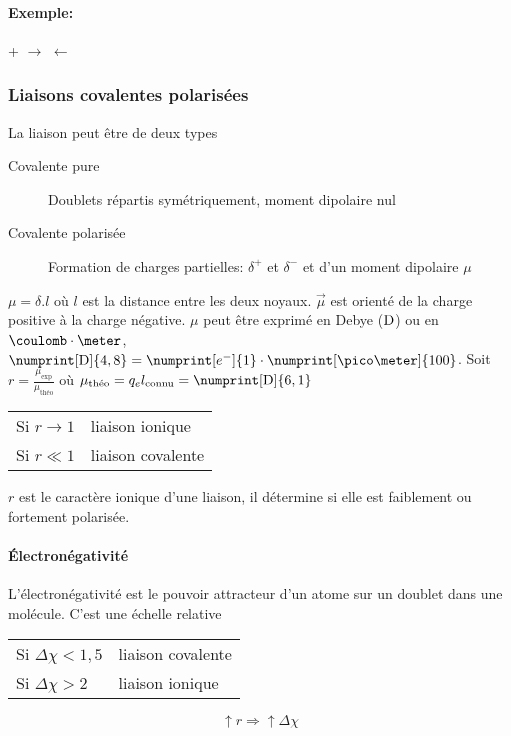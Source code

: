 \paragraph{Exemple:}
\begin{center}
	\hspace{0.3cm} + \hspace{0.3cm}$\longrightarrow$ $\leftarrow$
\end{center}
\subsubsection{Liaisons covalentes polarisées}
La liaison peut être de deux types
\begin{description}
	\item[Covalente pure] Doublets répartis symétriquement, moment dipolaire nul
	\item[Covalente polarisée] Formation de charges partielles: $\delta^+$ et $\delta^-$ et d'un moment dipolaire $\mu$
\end{description}
$\mu = \delta . l$ où $l$ est la distance entre les deux noyaux.
$\vec{\mu}$ est orienté de la charge positive à la charge négative.
$\mu$ peut être exprimé en Debye ($\mathrm{D}$) ou en $\coulomb\cdot\meter$, $\numprint[\debye]{4,8} = \numprint[e^-]{1} \cdot \numprint[\pico\meter]{100}$.
Soit $r = \frac{\mu_{\mathrm{exp}}}{\mu_{\textrm{théo}}}$ où $\mu_{\textrm{théo}} = q_e l_{\mathrm{connu}} = \numprint[\debye]{6,1}$
\begin{center}
	\begin{tabular}{ll}
		Si $r \to 1$ & liaison ionique\\
		Si $r \ll 1$ & liaison covalente
	\end{tabular}
\end{center}
$r$ est le caractère ionique d'une liaison, il détermine si elle est faiblement ou fortement polarisée.

\paragraph{\'Electronégativité}
L'électronégativité est le pouvoir attracteur d'un atome sur un doublet dans une molécule.
C'est une échelle relative
\begin{center}
	\begin{tabular}{ll}
		Si $\Delta \chi < 1,5$ & liaison covalente\\
		Si $\Delta \chi > 2$ & liaison ionique
	\end{tabular}
\end{center}
$$\uparrow r \Rightarrow \uparrow \Delta \chi$$

